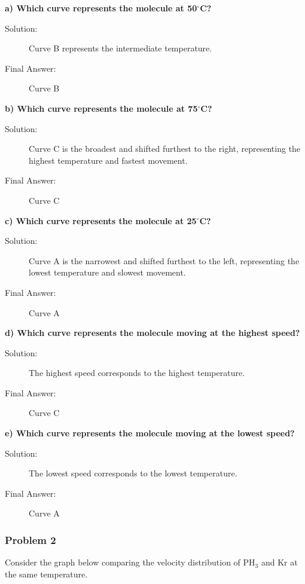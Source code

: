 \documentclass{article}
\begin{document}
\textbf{a) Which curve represents the molecule at 50$^{\circ}$C?}
\begin{description}
    \item[Solution:] Curve B represents the intermediate temperature.
    \item[Final Answer:] Curve B
\end{description}

\textbf{b) Which curve represents the molecule at 75$^{\circ}$C?}
\begin{description}
    \item[Solution:] Curve C is the broadest and shifted furthest to the right, representing the highest temperature and fastest movement.
    \item[Final Answer:] Curve C
\end{description}

\textbf{c) Which curve represents the molecule at 25$^{\circ}$C?}
\begin{description}
    \item[Solution:] Curve A is the narrowest and shifted furthest to the left, representing the lowest temperature and slowest movement.
    \item[Final Answer:] Curve A
\end{description}

\textbf{d) Which curve represents the molecule moving at the highest speed?}
\begin{description}
    \item[Solution:] The highest speed corresponds to the highest temperature.
    \item[Final Answer:] Curve C
\end{description}

\textbf{e) Which curve represents the molecule moving at the lowest speed?}
\begin{description}
    \item[Solution:] The lowest speed corresponds to the lowest temperature.
    \item[Final Answer:] Curve A
\end{description}

\subsubsection{Problem 2}
Consider the graph below comparing the velocity distribution of PH$_3$ and Kr at the same temperature.
\end{document}
